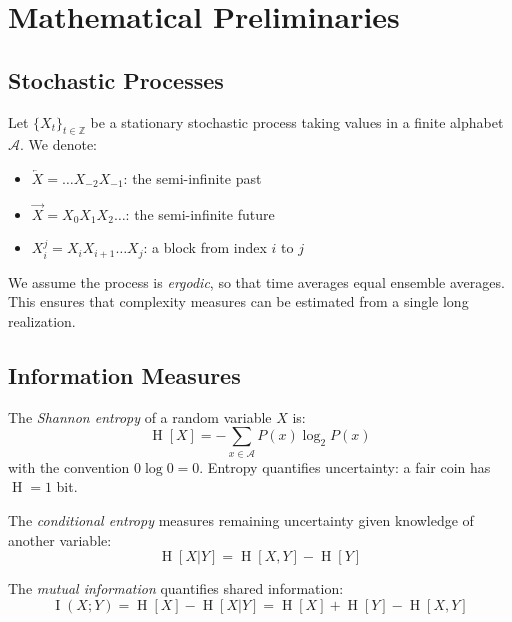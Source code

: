 \documentclass[11pt,twocolumn]{article}
\theoremstyle{plain}
\theoremstyle{definition}
\theoremstyle{remark}
\newcommand{\calA}{\mathcal{A}}
\newcommand{\Past}{\overleftarrow{X}}
\newcommand{\Future}{\overrightarrow{X}}
\DeclareMathOperator{\Ent}{H}
\DeclareMathOperator{\MI}{I}
\begin{document}
\section{Mathematical Preliminaries}
\label{sec:preliminaries}

\subsection{Stochastic Processes}

Let $\{X_t\}_{t \in \mathbb{Z}}$ be a stationary stochastic process taking values in a finite alphabet $\calA$. We denote:
\begin{itemize}[nosep]
    \item $\Past = \dots X_{-2} X_{-1}$: the semi-infinite past
    \item $\Future = X_0 X_1 X_2 \dots$: the semi-infinite future
    \item $X_i^{j} = X_i X_{i+1} \dots X_{j}$: a block from index $i$ to $j$
\end{itemize}

We assume the process is \emph{ergodic}, so that time averages equal ensemble averages. This ensures that complexity measures can be estimated from a single long realization.

\subsection{Information Measures}

The \emph{Shannon entropy} of a random variable $X$ is:
\begin{equation}
    \Ent[X] = -\sum_{x \in \calA} P(x) \log_2 P(x)
\end{equation}
with the convention $0 \log 0 = 0$. Entropy quantifies uncertainty: a fair coin has $\Ent = 1$ bit.

The \emph{conditional entropy} measures remaining uncertainty given knowledge of another variable:
\begin{equation}
    \Ent[X|Y] = \Ent[X,Y] - \Ent[Y]
\end{equation}

The \emph{mutual information} quantifies shared information:
\begin{equation}
    \MI(X;Y) = \Ent[X] - \Ent[X|Y] = \Ent[X] + \Ent[Y] - \Ent[X,Y]
\end{equation}
\end{document}
